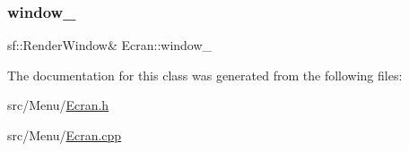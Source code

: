 \subsubsection{\texorpdfstring{window\+\_\+}{window\_}}
{\footnotesize\ttfamily sf\+::\+Render\+Window\& Ecran\+::window\+\_\+\hspace{0.3cm}{\ttfamily [protected]}}



The documentation for this class was generated from the following files\+:\begin{DoxyCompactItemize}
\item 
src/\+Menu/\mbox{\hyperlink{_ecran_8h}{Ecran.\+h}}\item 
src/\+Menu/\mbox{\hyperlink{_ecran_8cpp}{Ecran.\+cpp}}\end{DoxyCompactItemize}
